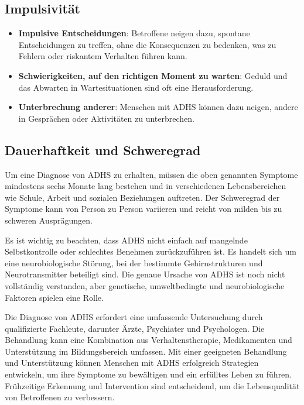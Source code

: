 \subsection{Impulsivität}

\begin{itemize}
\item \textbf{Impulsive Entscheidungen}: Betroffene neigen dazu, spontane Entscheidungen zu treffen, ohne die Konsequenzen zu bedenken, was zu Fehlern oder riskantem Verhalten führen kann.

\item \textbf{Schwierigkeiten, auf den richtigen Moment zu warten}: Geduld und das Abwarten in Wartesituationen sind oft eine Herausforderung.

\item \textbf{Unterbrechung anderer}: Menschen mit ADHS können dazu neigen, andere in Gesprächen oder Aktivitäten zu unterbrechen.
\end{itemize}

\subsection{Dauerhaftkeit und Schweregrad}

Um eine Diagnose von ADHS zu erhalten, müssen die oben genannten Symptome mindestens sechs Monate lang bestehen und in verschiedenen Lebensbereichen wie Schule, Arbeit und sozialen Beziehungen auftreten. Der Schweregrad der Symptome kann von Person zu Person variieren und reicht von milden bis zu schweren Ausprägungen.

Es ist wichtig zu beachten, dass ADHS nicht einfach auf mangelnde Selbstkontrolle oder schlechtes Benehmen zurückzuführen ist. Es handelt sich um eine neurobiologische Störung, bei der bestimmte Gehirnstrukturen und Neurotransmitter beteiligt sind. Die genaue Ursache von ADHS ist noch nicht vollständig verstanden, aber genetische, umweltbedingte und neurobiologische Faktoren spielen eine Rolle.

Die Diagnose von ADHS erfordert eine umfassende Untersuchung durch qualifizierte Fachleute, darunter Ärzte, Psychiater und Psychologen. Die Behandlung kann eine Kombination aus Verhaltenstherapie, Medikamenten und Unterstützung im Bildungsbereich umfassen. Mit einer geeigneten Behandlung und Unterstützung können Menschen mit ADHS erfolgreich Strategien entwickeln, um ihre Symptome zu bewältigen und ein erfülltes Leben zu führen. Frühzeitige Erkennung und Intervention sind entscheidend, um die Lebensqualität von Betroffenen zu verbessern.

